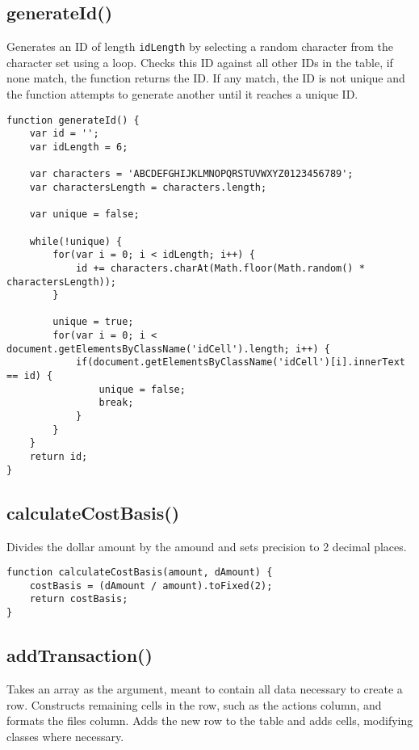 \documentclass[letterpaper]{article}
\begin{document}
\subsection{generateId()}

Generates an ID of length \lstinline{idLength} by selecting a random character from the character set using a loop.
Checks this ID against all other IDs in the table, if none match, the function returns the ID.
If any match, the ID is not unique and the function attempts to generate another until it reaches a unique ID.

\begin{lstlisting}[firstnumber=135]
function generateId() {
    var id = '';
    var idLength = 6;

    var characters = 'ABCDEFGHIJKLMNOPQRSTUVWXYZ0123456789';
    var charactersLength = characters.length;

    var unique = false;

    while(!unique) {
        for(var i = 0; i < idLength; i++) {
            id += characters.charAt(Math.floor(Math.random() * charactersLength));
        }

        unique = true;
        for(var i = 0; i < document.getElementsByClassName('idCell').length; i++) {
            if(document.getElementsByClassName('idCell')[i].innerText == id) {
                unique = false;
                break;
            }
        }
    }
    return id;
}
\end{lstlisting}

\subsection{calculateCostBasis()}

Divides the dollar amount by the amound and sets precision to 2 decimal places.

\begin{lstlisting}[firstnumber=160]
function calculateCostBasis(amount, dAmount) {
    costBasis = (dAmount / amount).toFixed(2);
    return costBasis;
}
\end{lstlisting}

\subsection{addTransaction()}

Takes an array as the argument, meant to contain all data necessary to create a row.
Constructs remaining cells in the row, such as the actions column, and formats the files column.
Adds the new row to the table and adds cells, modifying classes where necessary.
\end{document}
